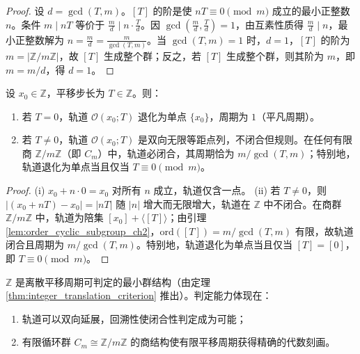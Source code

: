 \begin{proof}
设 $d = \gcd(T,m)$。$[T]$ 的阶是使 $nT \equiv 0 \pmod{m}$ 成立的最小正整数 $n$。条件 $m \mid nT$ 等价于 $\frac{m}{d} \mid n \cdot \frac{T}{d}$。因 $\gcd\!\left(\frac{m}{d}, \frac{T}{d}\right) = 1$，由互素性质得 $\frac{m}{d} \mid n$，最小正整数解为 $n = \frac{m}{d} = \frac{m}{\gcd(T,m)}$。当 $\gcd(T,m) = 1$ 时，$d = 1$，$[T]$ 的阶为 $m = |\mathbb{Z}/m\mathbb{Z}|$，故 $[T]$ 生成整个群；反之，若 $[T]$ 生成整个群，则其阶为 $m$，即 $m = m/d$，得 $d = 1$。
\end{proof}

\begin{theorem}[整数平移周期判据]\label{thm:integer_translation_criterion}
设 $x_0 \in \mathbb{Z}$，平移步长为 $T \in \mathbb{Z}$。则：
\begin{enumerate}[label=(\roman*)]
    \item 若 $T = 0$，轨道 $\mathcal{O}(x_0; T)$ 退化为单点 $\{x_0\}$，周期为 $1$（平凡周期）。
    \item 若 $T \neq 0$，轨道 $\mathcal{O}(x_0; T)$ 是双向无限等距点列，不闭合但规则。在任何有限商 $\mathbb{Z}/m\mathbb{Z}$（即 $C_m$）中，轨道必闭合，其周期恰为 $m/\gcd(T,m)$；特别地，轨道退化为单点当且仅当 $T \equiv 0 \pmod{m}$。
\end{enumerate}
\end{theorem}

\begin{proof}
(i) $x_0 + n\cdot 0 = x_0$ 对所有 $n$ 成立，轨道仅含一点。
(ii) 若 $T \neq 0$，则 $|(x_0+nT) - x_0| = |nT|$ 随 $|n|$ 增大而无限增大，轨道在 $\mathbb{Z}$ 中不闭合。在商群 $\mathbb{Z}/m\mathbb{Z}$ 中，轨道为陪集 $[x_0] + \langle [T] \rangle$；由引理 \ref{lem:order_cyclic_subgroup_ch2}，$\mathrm{ord}([T]) = m/\gcd(T,m)$ 有限，故轨道闭合且周期为 $m/\gcd(T,m)$。特别地，轨道退化为单点当且仅当 $[T] = [0]$，即 $T \equiv 0 \pmod{m}$。
\end{proof}

\begin{corollary}[整数与离散平移周期]\label{cor:integer_discrete_translation}
$\mathbb{Z}$ 是离散平移周期可判定的最小群结构（由定理 \ref{thm:integer_translation_criterion} 推出）。判定能力体现在：
\begin{enumerate}[label=(\roman*)]
    \item 轨道可以双向延展，回溯性使闭合性判定成为可能；
    \item 有限循环群 $C_m \cong \mathbb{Z}/m\mathbb{Z}$ 的商结构使有限平移周期获得精确的代数刻画。
\end{enumerate}
\end{corollary}

